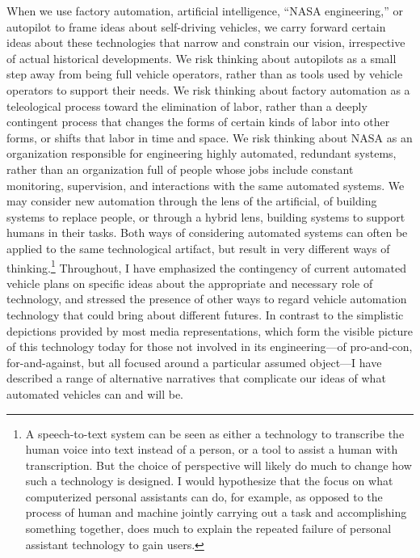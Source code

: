 When we use factory automation, artificial intelligence, ``NASA
engineering,'' or autopilot to frame ideas about self-driving
vehicles, we carry forward certain ideas about these technologies that
narrow and constrain our vision, irrespective of actual historical
developments. We risk 
thinking about autopilots as a small step away from being full vehicle
operators, rather than as tools used by vehicle operators to support
their needs. We risk thinking about factory automation as a
teleological process toward the elimination of labor, rather than a
deeply contingent process that changes the forms of certain kinds of
labor into other forms, or shifts that labor in time and space. We
risk thinking about NASA as an organization responsible for
engineering highly automated, redundant systems, rather than an
organization full of people whose jobs include constant monitoring,
supervision, and interactions with the same automated systems. We may
consider new automation through the lens of the artificial, of
building systems to replace people, or through a hybrid lens, building
systems to support humans in their tasks. Both ways of considering
automated systems can often be applied to the same technological
artifact, but result in very different ways of thinking.\footnote{A
speech-to-text system can be seen as either a technology to transcribe 
the human voice into text instead of a person, or a tool to assist a
human with transcription. But the choice of perspective will likely do
much to change how such a technology is designed. I would hypothesize that
the focus on what computerized personal assistants can do, for
example, as opposed to the process of human and machine jointly
carrying out a task and accomplishing something together, does much to
explain the repeated failure of personal assistant technology to gain
users.}  Throughout, I have emphasized the contingency of current
automated vehicle plans on specific ideas about the appropriate and
necessary role of technology, and stressed the presence of other ways
to regard vehicle automation technology that could bring about
different futures. In contrast to the simplistic depictions provided by
most media representations, which form the visible picture of this technology today
for those not involved in its engineering---of pro-and-con, for-and-against, but all
focused around a particular assumed object---I have described a
range of alternative narratives that complicate our ideas of what
automated vehicles can and will be.

